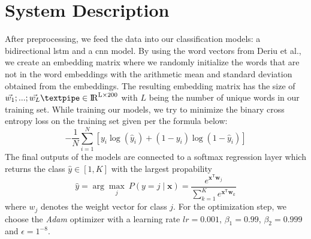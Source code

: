 \documentclass[11pt]{article}
\begin{document}
\section{System Description}
After preprocessing, we feed the data into our classification models: a bidirectional \ac{lstm} and a \ac{cnn} model. By using the word vectors from Deriu et al., we create an embedding matrix where we randomly initialize the words that are not in the word embeddings with the arithmetic mean and standard deviation obtained from the embeddings. The resulting embedding matrix has the size of \textpipe $\vec{w_1}; ... ;\vec{w_L} \textpipe \in \rm{I\!R}^{L\times200}$ with $L$ being the number of unique words in our training set.
\newline
While training our models, we try to minimize the binary cross entropy loss on the training set given per the formula below:
\begin{equation}
-\frac{1}{N}\sum_{i=1}^N [y_i \log(\hat{y}_i)+(1-y_i) \log(1-\hat{y}_i)]
\end{equation}
The final outputs of the models are connected to a softmax regression layer which returns the class $\hat{y}\in[1,K]$ with the largest propability
\begin{equation}
{\displaystyle \hat{y}=\arg\max_{j} \ P(y=j\mid \mathbf {x} )={\frac {e^{\mathbf {x} ^{\mathsf {T}}\mathbf {w} _{j}}}{\sum _{k=1}^{K}e^{\mathbf {x} ^{\mathsf {T}}\mathbf {w} _{k}}}}}
\end{equation}
where $w_j$ denotes the weight vector for class $j$. For the optimization step, we choose the \textit{Adam} optimizer \cite{RN67} with a learning rate $lr=0.001$, $\beta_1=0.99$, $\beta_2=0.999$ and $\epsilon=1^{-8}$.
\end{document}
